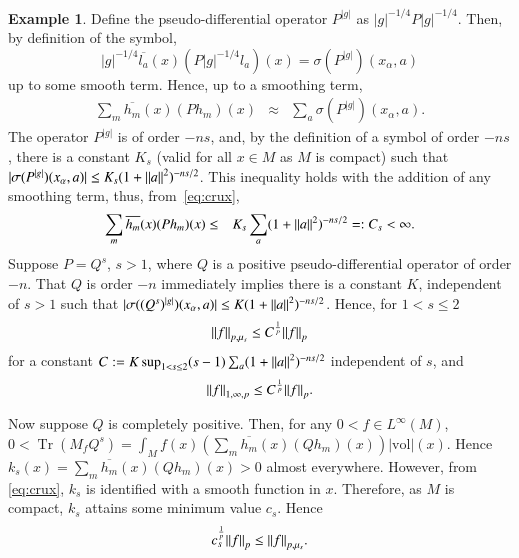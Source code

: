 \documentclass[final,1p]{elsarticle}
\numberwithin{equation}{section}
\theoremstyle{plain}
\theoremstyle{definition}
\newtheorem{ex}[thm]{Example}
\begin{document}
\begin{ex}
Define the pseudo-differential
operator $P^{|g|}$ as
$|g|^{-1/4} P |g|^{-1/4}$.
Then, by definition of the symbol,
$$
|g|^{-1/4} \overline{l_a}(x) (P|g|^{-1/4}l_a)(x)
= \sigma(P^{|g|})(x_\alpha,a)
$$
up to some smooth term.  Hence, up to a smoothing term,
\begin{eqnarray}
\sum_m \overline{h_m}(x)(P h_m)(x)
& \approx &  \sum_{a} \sigma(P^{|g|})(x_\alpha,a) \label{eq:crux}.
\end{eqnarray}
The operator $P^{|g|}$ is of order
$-ns$, and, by the definition of a symbol of order $-ns$,
there is a constant $K_s$ (valid for all $x \in M$ as $M$ is compact)
such that $| \sigma(P^{|g|})(x_\alpha,a) | \leq K_s (1+{\mbox{\ensuremath{\| {a} \|}}}^2)^{-ns/2}$.
This inequality holds with the addition of any smoothing term,
thus, from~\eqref{eq:crux},
\begin{eqnarray*}
\sum_m \overline{h_m}(x)(P h_m)(x)
& \leq &  K_s \sum_{a} (1+{\mbox{\ensuremath{\| {a} \|}}}^2)^{-ns/2} =: C_s < \infty.
\end{eqnarray*}
Suppose $P = Q^s$, $s > 1$, where $Q$ is a positive pseudo-differential
operator of order $-n$.  That $Q$ is order $-n$
immediately implies there is a constant $K$, independent
of $s > 1$ such that $| \sigma((Q^s)^{|g|})(x_\alpha,a) | \leq K (1+{\mbox{\ensuremath{\| {a} \|}}}^2)^{-ns/2}$.
Hence, for $1< s \leq 2$
\begin{equation} \label{eq:bound1}
{\mbox{\ensuremath{\| {f} \|}}}_{p,\mu_s} \leq C^\frac{1}{p} {\mbox{\ensuremath{\| {f} \|}}}_p
\end{equation}
for a constant $C : = K \sup_{1<s\leq2} (s-1)\sum_{a} (1+{\mbox{\ensuremath{\| {a} \|}}}^2)^{-ns/2}$ independent of $s$, and 
\begin{equation} \label{eq:bound2}
{\mbox{\ensuremath{\| {f} \|}}}_{1,\infty,p} \leq  C^\frac{1}{p} {\mbox{\ensuremath{\| {f} \|}}}_p .
\end{equation}

Now suppose $Q$ is completely positive.  Then,
for any $0 < f \in L^\infty(M)$,
$0 < \operatorname{Tr}(M_fQ^s) = \int_M f(x) (\sum_m \overline{h_m}(x)(Q h_m)(x)) |\mathrm{vol}|(x)$.
Hence $k_s(x) = \sum_m \overline{h_m}(x)(Q h_m)(x) > 0$ almost everywhere.
However, from \eqref{eq:crux}, $k_s$ is identified with a smooth function in $x$.
Therefore, as $M$ is compact, $k_s$ attains some minimum value $c_s$.
Hence
\begin{equation} \label{eq:bound3}
c_s^{\frac{1}{p}} {\mbox{\ensuremath{\| {f} \|}}}_p \leq {\mbox{\ensuremath{\| {f} \|}}}_{p,\mu_s} .
\end{equation}


\end{ex}
\end{document}
